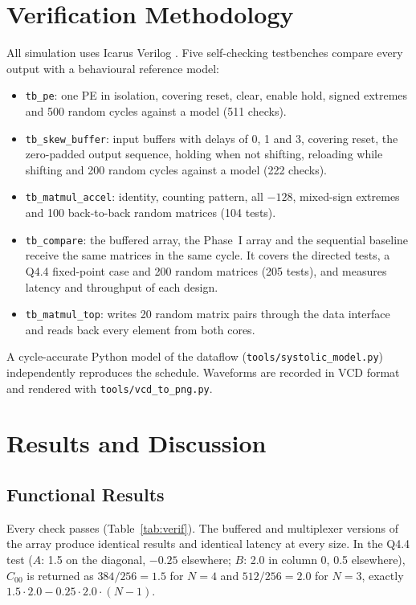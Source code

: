 \documentclass[conference]{IEEEtran}
\begin{document}
\section{Verification Methodology}
All simulation uses Icarus Verilog \cite{iverilog}. Five self-checking
testbenches compare every output with a behavioural reference model:
\begin{itemize}
\item \texttt{tb\_pe}: one PE in isolation, covering reset, clear, enable hold,
signed extremes and 500 random cycles against a model (511 checks).
\item \texttt{tb\_skew\_buffer}: input buffers with delays of 0, 1 and 3,
covering reset, the zero-padded output sequence, holding when not shifting,
reloading while shifting and 200 random cycles against a model (222 checks).
\item \texttt{tb\_matmul\_accel}: identity, counting pattern, all $-128$,
mixed-sign extremes and 100 back-to-back random matrices (104 tests).
\item \texttt{tb\_compare}: the buffered array, the Phase~I array and the
sequential baseline receive the same matrices in the same cycle. It covers the
directed tests, a Q4.4 fixed-point case and 200 random matrices (205 tests),
and measures latency and throughput of each design.
\item \texttt{tb\_matmul\_top}: writes 20 random matrix pairs through the data
interface and reads back every element from both cores.
\end{itemize}
A cycle-accurate Python model of the dataflow (\texttt{tools/systolic\_model.py})
independently reproduces the schedule. Waveforms are recorded in VCD format and
rendered with \texttt{tools/vcd\_to\_png.py}.

\section{Results and Discussion}
\subsection{Functional Results}
Every check passes (Table~\ref{tab:verif}). The buffered and multiplexer
versions of the array produce identical results and identical latency at every
size. In the Q4.4 test ($A$: 1.5 on the diagonal, $-0.25$ elsewhere; $B$: 2.0 in
column 0, 0.5 elsewhere), $C_{00}$ is returned as $384/256 = 1.5$ for $N = 4$ and
$512/256 = 2.0$ for $N = 3$, exactly $1.5 \cdot 2.0 - 0.25 \cdot 2.0 \cdot (N-1)$.
\end{document}
